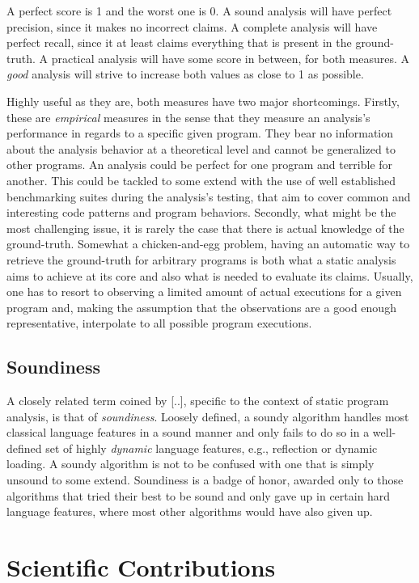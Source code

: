 A perfect score is 1 and the worst one is 0. A sound analysis will have perfect precision, since it makes no incorrect claims. A complete analysis will have perfect recall, since it at least claims everything that is present in the ground-truth. A practical analysis will have some score in between, for both measures. A \emph{good} analysis will strive to increase both values as close to 1 as possible.

Highly useful as they are, both measures have two major shortcomings. Firstly, these are \emph{empirical} measures in the sense that they measure an analysis's performance in regards to a specific given program. They bear no information about the analysis behavior at a theoretical level and cannot be generalized to other programs. An analysis could be perfect for one program and terrible for another. This could be tackled to some extend with the use of well established benchmarking suites during the analysis's testing, that aim to cover common and interesting code patterns and program behaviors. Secondly, what might be the most challenging issue, it is rarely the case that there is actual knowledge of the ground-truth. Somewhat a chicken-and-egg problem, having an automatic way to retrieve the ground-truth for arbitrary programs is both what a static analysis aims to achieve at its core and also what is needed to evaluate its claims. Usually, one has to resort to observing a limited amount of actual executions for a given program and, making the assumption that the observations are a good enough representative, interpolate to all possible program executions.

\subsection{Soundiness}

A closely related term coined by [..], specific to the context of static program analysis, is that of \emph{soundiness}. Loosely defined, a soundy algorithm handles most classical language features in a sound manner and only fails to do so in a well-defined set of highly \emph{dynamic} language features, e.g., reflection or dynamic loading. A soundy algorithm is not to be confused with one that is simply unsound to some extend. Soundiness is a badge of honor, awarded only to those algorithms that tried their best to be sound and only gave up in certain hard language features, where most other algorithms would have also given up.
\color{black}


\section{Scientific Contributions}

